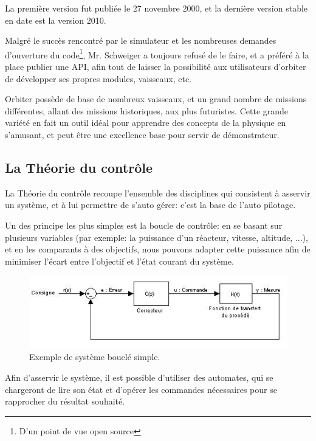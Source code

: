\documentclass[a4paper,11pt]{article}
\begin{document}
        La première version fut publiée le 27 novembre 2000, et la dernière version stable en date est la version 2010.

        Malgré le succès rencontré par le simulateur et les nombreuses demandes d'ouverture du code\footnote{D'un point de vue open source}, Mr. Schweiger a toujours refusé de le faire, et a préféré à la place publier une API, afin tout de laisser la possibilité aux utilisateurs d'orbiter de développer ses propres modules, vaisseaux, etc.

        Orbiter possède de base de nombreux vaisseaux, et un grand nombre de missions différentes, allant des missions historiques, aux plus futuristes. Cette grande variété en fait un outil idéal pour apprendre des concepts de la physique en s'amusant, et peut être une excellence base pour servir de démonstrateur.

    \subsection{La Théorie du contrôle}
        La Théorie du contrôle recoupe l'ensemble des disciplines qui consistent à asservir un système, et à lui permettre de s'auto gérer: c'est la base de l’auto pilotage.

        Un des principe les plus simples est la boucle de contrôle: en se basant sur plusieurs variables (par exemple: la puissance d'un réacteur, vitesse, altitude, ...), et en les comparants à des objectifs, nous pouvons adapter cette puissance afin de minimiser l'écart entre l'objectif et l'état courant du système.

        \begin{figure}[!h]
            \begin{center}
                \includegraphics[width=1\textwidth]{img/boucle_controle.jpg}
                \caption{Exemple de système bouclé simple.}
            \end{center}
        \end{figure}
        
        Afin d'asservir le système, il est possible d'utiliser des automates, qui se chargeront de lire son état et d'opérer les commandes nécessaires pour se rapprocher du résultat souhaité.
\end{document}
